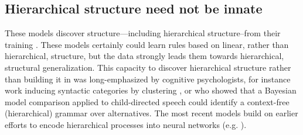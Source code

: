 \documentclass[output=paper,colorlinks,citecolor=brown
]{langscibook}
\begin{document}
\subsection{Hierarchical structure need not be innate}

These models discover structure---including hierarchical structure--from their training \citep{hewitt2019structural,manning2020emergent,lin2019open,tenney2019you,warstadt2020can,kim2020pre,linzen2021syntactic,mahowald2023dissociating}. These models certainly could learn rules based on linear, rather than hierarchical, structure, but the data strongly leads them towards hierarchical, structural generalization. This capacity to discover hierarchical structure rather than building it in was long-emphasized by cognitive psychologists, for instance work inducing syntactic categories by clustering \citep{redington1998distributional,clark2000inducing}, or \cite{perfors2011learnability} who showed that a Bayesian model comparison applied to child-directed speech could identify a context-free (hierarchical) grammar over alternatives.  The most recent models build on earlier efforts to encode hierarchical processes into neural networks (e.g. \cite{tabor1997parsing,christiansen1999toward,tabor2000fractal,smolensky2006harmonic}).  
\end{document}
